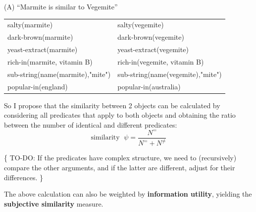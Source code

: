 (A) ``Marmite is similar to Vegemite''\\
\hspace*{1cm} \begin{tabular}{l|l}
salty(marmite)                   & salty(vegemite)\\
dark-brown(marmite)              & dark-brown(vegemite)\\
yeast-extract(marmite)           & yeast-extract(vegemite)\\
rich-in(marmite, vitamin B)      & rich-in(vegemite, vitamin B)\\
sub-string(name(marmite),"mite") & sub-string(name(vegemite),"mite")\\
popular-in(england)              & popular-in(australia)
\end{tabular}

So I propose that the similarity between 2 objects can be calculated by considering all predicates that apply to both objects and obtaining the ratio between the number of identical and different predicates:
\begin{equation}
\mbox{similarity } \; \psi = \frac{N^{=}}{N^{=} + N^{\neq}}
\end{equation}

\{ TO-DO:  If the predicates have complex structure, we need to (recursively) compare the other arguments, and if the latter are different, adjust for their differences. \}

The above calculation can also be weighted by \textbf{information utility}, yielding the \textbf{subjective similarity} measure.

